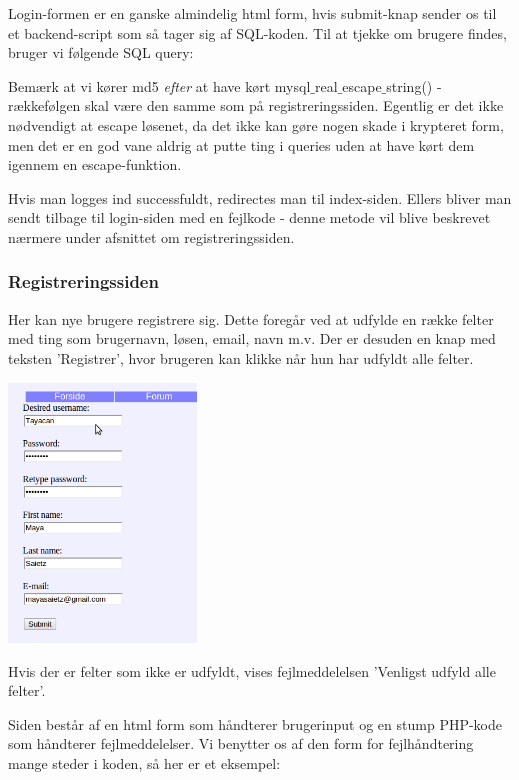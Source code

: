 \documentclass{article}
\begin{document}
Login-formen er en ganske almindelig html form, hvis submit-knap sender os til et backend-script som så tager sig af SQL-koden. Til at tjekke om brugere findes, bruger vi følgende SQL query:



Bemærk at vi kører md5 \emph{efter} at have kørt mysql$\_$real$\_$escape$\_$string() - rækkefølgen skal være den samme som på registreringssiden. Egentlig er det ikke nødvendigt at escape løsenet, da det ikke kan gøre nogen skade i krypteret form, men det er en god vane aldrig at putte ting i queries uden at have kørt dem igennem en escape-funktion.

Hvis man logges ind successfuldt, redirectes man til index-siden. Ellers bliver man sendt tilbage til login-siden med en fejlkode - denne metode vil blive beskrevet nærmere under afsnittet om registreringssiden.

\subsubsection{Registreringssiden}
Her kan nye brugere registrere sig. Dette foregår ved at udfylde en række felter med ting som brugernavn, løsen, email, navn m.v. Der er desuden en knap med teksten 'Registrer', hvor brugeren kan klikke når hun har udfyldt alle felter.

\begin{center}
\includegraphics[width=50mm]{mi08.png}
\end{center}

Hvis der er felter som ikke er udfyldt, vises fejlmeddelelsen 'Venligst udfyld alle felter'.

Siden består af en html form som håndterer brugerinput og en stump PHP-kode som håndterer fejlmeddelelser. Vi benytter os af den form for fejlhåndtering mange steder i koden, så her er et eksempel:
\end{document}
